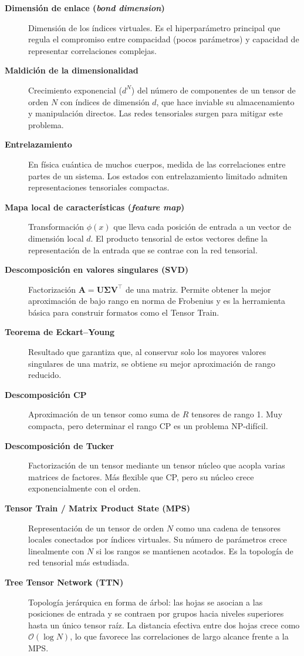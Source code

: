 \begin{description}
  \item[\textbf{Dimensión de enlace (\textit{bond dimension})}] Dimensión de los índices virtuales. Es el hiperparámetro principal que regula el compromiso entre compacidad (pocos parámetros) y capacidad de representar correlaciones complejas.
  \item[\textbf{Maldición de la dimensionalidad}] Crecimiento exponencial ($d^N$) del número de componentes de un tensor de orden $N$ con índices de dimensión $d$, que hace inviable su almacenamiento y manipulación directos. Las redes tensoriales surgen para mitigar este problema.
  \item[\textbf{Entrelazamiento}] En física cuántica de muchos cuerpos, medida de las correlaciones entre partes de un sistema. Los estados con entrelazamiento limitado admiten representaciones tensoriales compactas.
  \item[\textbf{Mapa local de características (\textit{feature map})}] Transformación $\phi(x)$ que lleva cada posición de entrada a un vector de dimensión local $d$. El producto tensorial de estos vectores define la representación de la entrada que se contrae con la red tensorial.
  \item[\textbf{Descomposición en valores singulares (SVD)}] Factorización $\mathbf{A}=\mathbf{U}\boldsymbol{\Sigma}\mathbf{V}^\top$ de una matriz. Permite obtener la mejor aproximación de bajo rango en norma de Frobenius y es la herramienta básica para construir formatos como el Tensor Train.
  \item[\textbf{Teorema de Eckart--Young}] Resultado que garantiza que, al conservar solo los mayores valores singulares de una matriz, se obtiene su mejor aproximación de rango reducido.
  \item[\textbf{Descomposición CP}] Aproximación de un tensor como suma de $R$ tensores de rango 1. Muy compacta, pero determinar el rango CP es un problema NP-difícil.
  \item[\textbf{Descomposición de Tucker}] Factorización de un tensor mediante un tensor núcleo que acopla varias matrices de factores. Más flexible que CP, pero su núcleo crece exponencialmente con el orden.
  \item[\textbf{Tensor Train / Matrix Product State (MPS)}] Representación de un tensor de orden $N$ como una cadena de tensores locales conectados por índices virtuales. Su número de parámetros crece linealmente con $N$ si los rangos se mantienen acotados. Es la topología de red tensorial más estudiada.
  \item[\textbf{Tree Tensor Network (TTN)}] Topología jerárquica en forma de árbol: las hojas se asocian a las posiciones de entrada y se contraen por grupos hacia niveles superiores hasta un único tensor raíz. La distancia efectiva entre dos hojas crece como $\mathcal{O}(\log N)$, lo que favorece las correlaciones de largo alcance frente a la MPS.

\end{description}
